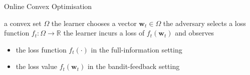 \begin{algorithm}[H]
  \caption{Online Convex Optimisation}
  \label{alg:oco}
  \begin{algorithmic}[1]
     a convex set $\Omega$
      \STATE the learner chooses a vector $\mathbf{w}_t \in \Omega$
      \STATE the adversary selects a loss function $f_t : \Omega \rightarrow \mathbb{R}$
      \STATE the learner incurs a loss of $f_t(\mathbf{w}_{t})$ and observes
      \begin{itemize}
		\item the loss function $f_t(\cdot)$ in the full-information setting
		\item the loss value $f_t(\mathbf{w}_t)$ in the bandit-feedback setting
	\end{itemize}
    \ENDFOR
  \end{algorithmic}
\end{algorithm}

